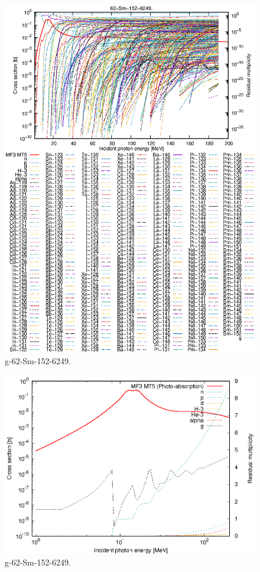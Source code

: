 \begin{figure}
 \includegraphics[width=\linewidth]{eps/g_62-Sm-152_6249.eps}
  \caption{g-62-Sm-152-6249.}
\end{figure}
\newpage \clearpage

\begin{figure}
 \includegraphics[width=\linewidth]{eps-log/g_62-Sm-152_6249.eps}
 \caption{g-62-Sm-152-6249.}
\end{figure}
\newpage \clearpage

